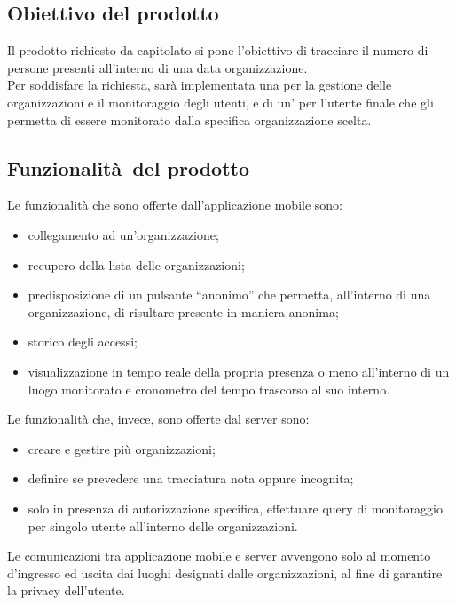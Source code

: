 \documentclass[../analisi-dei-requisiti]{subfiles}
\begin{document}
\subsection{Obiettivo del prodotto}%
\label{sub:obiettivo_del_prodotto}
Il prodotto richiesto da capitolato si pone l'obiettivo di tracciare il numero di persone presenti all’interno di una data organizzazione.\\
Per soddisfare la richiesta, sarà implementata una  per la gestione delle organizzazioni e il monitoraggio degli utenti, e
di un' per l'utente finale che gli permetta di essere monitorato dalla specifica organizzazione scelta.

\subsection{Funzionalità del prodotto}%
\label{sub:funzionalita_del_prodotto}
Le funzionalità che sono offerte dall'applicazione mobile sono:
\begin{itemize}
  \item collegamento ad un’organizzazione;
  \item recupero della lista delle organizzazioni;
  \item predisposizione di un pulsante “anonimo” che permetta, all’interno di una organizzazione, di risultare presente in maniera anonima;
  \item storico degli accessi;
  \item visualizzazione in tempo reale della propria presenza o meno all’interno di un luogo monitorato e cronometro del tempo trascorso al suo interno.
\end{itemize}

Le funzionalità che, invece, sono offerte dal server sono:
\begin{itemize}
  \item creare e gestire più organizzazioni;
  \item definire se prevedere una tracciatura nota oppure incognita;
  \item solo in presenza di autorizzazione specifica, effettuare query di monitoraggio per singolo utente all’interno delle organizzazioni.
\end{itemize}
Le comunicazioni tra applicazione mobile e server avvengono solo al momento d'ingresso ed uscita dai luoghi designati dalle organizzazioni, al fine di garantire
la privacy dell'utente.
\end{document}
